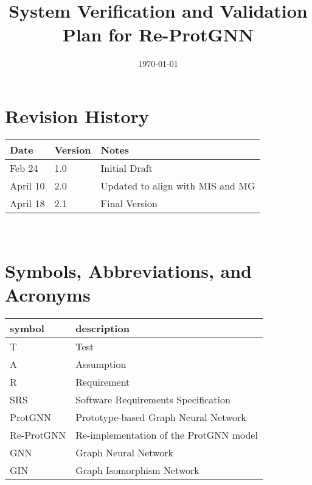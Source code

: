 \documentclass[12pt, titlepage]{article}
\begin{document}
\title{System Verification and Validation Plan for Re-ProtGNN} 
\author{\authname}
\date{\today}
	
\maketitle


\section*{Revision History}

\begin{tabularx}{\textwidth}{p{3cm}p{2cm}X}
\toprule {\bf Date} & {\bf Version} & {\bf Notes}\\
\midrule
Feb 24 & 1.0 & Initial Draft\\
April 10 & 2.0 & Updated to align with MIS and MG\\
April 18 & 2.1 & Final Version\\
\bottomrule
\end{tabularx}

~\\


\newpage

\tableofcontents

\listoftables


\newpage

\section{Symbols, Abbreviations, and Acronyms}

\renewcommand{\arraystretch}{1.2}
\begin{tabular}{l l} 
  \toprule		
  \textbf{symbol} & \textbf{description}\\
  \midrule 
  T & Test\\
  A & Assumption\\
  R & Requirement\\
  SRS & Software Requirements Specification\\
  ProtGNN & Prototype-based Graph Neural Network\\
  Re-ProtGNN & Re-implementation of the ProtGNN model\\
  GNN & Graph Neural Network\\
  GIN & Graph Isomorphism Network\\
  \bottomrule
\end{tabular}\\
\end{document}
